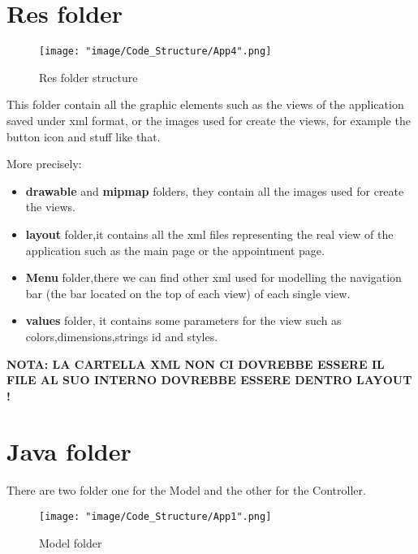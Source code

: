 \section{Res folder}

\begin{figure}[H]
\begin{center}
\texttt{[image: "image/Code\_Structure/App4".png]}
\caption{Res folder structure}
\end{center}
\end{figure}

This folder contain all the graphic elements such as  the views of the application saved under xml format, or the images used for create the views, for example the button icon and stuff like that.

More precisely:

\begin{itemize}

\item \textbf{drawable} and \textbf{mipmap} folders, they contain all the images used for create the views.

\item \textbf{layout} folder,it contains all the xml files representing the real view of the application such as the main page or the appointment page.

\item \textbf{Menu }folder,there we can find other xml used for modelling the navigation bar (the bar located on the top of each view) of each single view.

\item \textbf{values} folder, it contains some parameters for the view such as colors,dimensions,strings id and styles.  

\end{itemize}

\textbf{NOTA: LA CARTELLA XML NON CI DOVREBBE ESSERE IL FILE AL SUO INTERNO DOVREBBE ESSERE DENTRO LAYOUT !}

\section{Java folder}

There are two folder one for the Model and the other for the Controller.

\begin{figure}[H]
\begin{center}
\texttt{[image: "image/Code\_Structure/App1".png]}
\caption{Model folder}
\end{center}
\end{figure}


